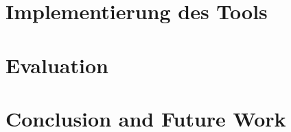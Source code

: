 \documentclass[a4paper,12pt,oneside, bibliography=totoc]
{scrbook}
\begin{document}
\chapter{Implementierung des Tools}


\chapter{Evaluation}
	\label{sec:evaluation}
	

\chapter{Conclusion and Future Work}
\label{sec:conclusion}



\printbibliography

\clearpage 





\end{document}
